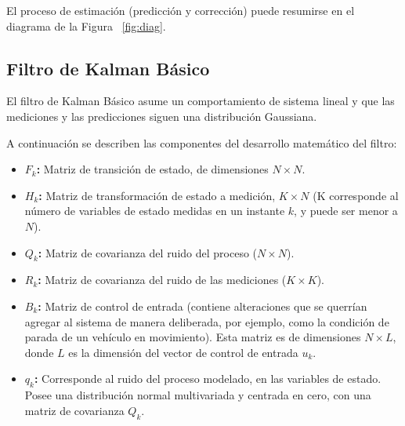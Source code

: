 El proceso de estimaci\'on (predicci\'on y correcci\'on) puede resumirse en el diagrama de la Figura ~\ref{fig:diag}. 
 
\subsection{Filtro de Kalman B\'asico}
El filtro de Kalman B\'asico \cite{kalman} asume un comportamiento de sistema lineal y que las mediciones y las predicciones siguen una distribuci\'on Gaussiana. 
\bigskip

A continuaci\'on se describen las componentes del desarrollo matem\'atico del filtro:

\begin{itemize}
\item \textbf{$F_k$:} Matriz de transici\'on de estado, de dimensiones $N\times N$.
\item \textbf{$H_k$:} Matriz de transformaci\'on de estado a medici\'on, $K\times N$ (K corresponde al n\'umero de variables de estado medidas en un instante $k$, y puede ser menor a $N$).
\item \textbf{$Q_k$:} Matriz de covarianza del ruido del proceso ($N\times N$).
\item \textbf{$R_k$:} Matriz de covarianza del ruido de las mediciones ($K\times K$).
\item \textbf{$B_k$:} Matriz de control de entrada (contiene alteraciones que se querr\'ian agregar al sistema de manera deliberada, por ejemplo, como la condici\'on de parada de un veh\'iculo en movimiento). Esta matriz es de dimensiones $N\times L$, donde $L$ es la dimensi\'on del vector de control de entrada $u_k$.
\item \textbf{$q_k$:} Corresponde al ruido del proceso modelado, en las variables de estado. Posee una distribuci\'on normal multivariada y centrada en cero, con una matriz de covarianza $Q_k$.
\end{itemize}
\bigskip


